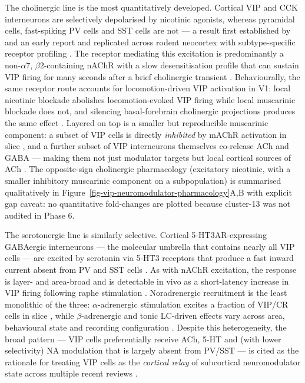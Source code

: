\documentclass[11pt]{article}
\begin{document}
The cholinergic line is the most quantitatively developed. Cortical VIP and CCK interneurons are selectively depolarised by nicotinic agonists, whereas pyramidal cells, fast-spiking PV cells and SST cells are not --- a result first established by \citet{Porter1999} and an early report and replicated across rodent neocortex with subtype-specific receptor profiling \citep{Vonengelhardt2007, Arroyo2012}. The receptor mediating this excitation is predominantly a non-$\alpha$7, $\beta$2-containing nAChR with a slow desensitisation profile that can sustain VIP firing for many seconds after a brief cholinergic transient \citep{Arroyo2012, Porter1999, Fu2014, Letzkus2011}. Behaviourally, the same receptor route accounts for locomotion-driven VIP activation in V1: local nicotinic blockade abolishes locomotion-evoked VIP firing while local muscarinic blockade does not, and silencing basal-forebrain cholinergic projections produces the same effect \citep{Fu2014, Sabri2024}. Layered on top is a smaller but reproducible muscarinic component: a subset of VIP cells is directly \textit{inhibited} by mAChR activation in slice \citep{Obermayer2019, Granger2020}, and a further subset of VIP interneurons themselves co-release ACh and GABA --- making them not just modulator targets but local cortical sources of ACh \citep{Granger2020, Obermayer2019, Dudai2020}. The opposite-sign cholinergic pharmacology (excitatory nicotinic, with a smaller inhibitory muscarinic component on a subpopulation) is summarised qualitatively in Figure~\ref{fig-vip-neuromodulator-pharmacology}A,B with explicit gap caveat: no quantitative fold-changes are plotted because cluster-13 was not audited in Phase 6.

The serotonergic line is similarly selective. Cortical 5-HT3AR-expressing GABAergic interneurons --- the molecular umbrella that contains nearly all VIP cells \citep{Rudy2011, Lee2010, Vucurovic2010, Frazer2017} --- are excited by serotonin via 5-HT3 receptors that produce a fast inward current absent from PV and SST cells \citep{Ferezou2002, Vucurovic2010, Frazer2017}. As with nAChR excitation, the response is layer- and area-broad and is detectable in vivo as a short-latency increase in VIP firing following raphe stimulation \citep{Frazer2017}. Noradrenergic recruitment is the least monolithic of the three: $\alpha$-adrenergic stimulation excites a fraction of VIP/CR cells in slice \citep{Cauli2014, Caputi2009}, while $\beta$-adrenergic and tonic LC-driven effects vary across area, behavioural state and recording configuration \citep{Cauli2014, Letzkus2011, Szadai2022}. Despite this heterogeneity, the broad pattern --- VIP cells preferentially receive ACh, 5-HT and (with lower selectivity) NA modulation that is largely absent from PV/SST --- is cited as the rationale for treating VIP cells as the \textit{cortical relay} of subcortical neuromodulator state across multiple recent reviews \citep{Letzkus2011, Rudy2011, Pronneke2019, Sabri2024}.
\end{document}
